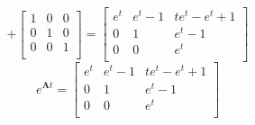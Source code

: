 \documentclass{article}
\begin{document}
\begin{itemize}
$$+
\begin{bmatrix}
1 & 0 & 0 \\
0 & 1 & 0 \\
0 & 0 & 1 \\
\end{bmatrix}
=
\begin{bmatrix}
e^t & e^t-1 & te^t-e^t+1\\
0 & 1 & e^t-1 \\
0 & 0 & e^t  \\
\end{bmatrix}
$$
$$
e^{\mathbf{A}t}
=
\begin{bmatrix}
e^t & e^t-1 & te^t-e^t+1\\
0 & 1 & e^t-1 \\
0 & 0 & e^t  \\
\end{bmatrix}
$$
\end{itemize}
\end{document}
